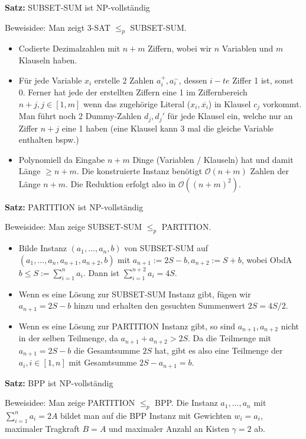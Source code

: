 \documentclass[a4paper,graphics,11pt]{article}
\begin{document}
\textbf{Satz:} SUBSET-SUM ist \textsf{NP}-vollständig

Beweisidee: Man zeigt 3-SAT $\leq_p$ SUBSET-SUM.
\begin{itemize}
    \item Codierte Dezimalzahlen mit $n+m$ Ziffern, wobei wir $n$ Variablen und $m$ Klauseln haben.
    \item Für jede Variable $x_i$ erstelle 2 Zahlen $a_i^+, a_i^-$, dessen $i-te$ Ziffer
        1 ist, sonst 0. Ferner hat jede der erstellten Ziffern eine 1 im Ziffernbereich $n+j, j \in [1,m]$
        wenn das zugehörige Literal ($x_i, \overline{x_i}$) in Klausel $c_j$ vorkommt. Man führt noch 2 Dummy-Zahlen $d_j,d_j'$
        für jede Klausel ein, welche nur an Ziffer $n+j$ eine 1 haben (eine Klausel kann 3 mal die gleiche Variable enthalten bspw.)
    \item Polynomiell da Eingabe $n+m$ Dinge (Variablen / Klauseln) hat und damit Länge $\geq n+m$.
        Die konstruierte Instanz benötigt $\mathcal{O}(n+m)$ Zahlen der Länge $n+m$. Die Reduktion erfolgt
        also in $\mathcal{O}((n+m)^2)$.
\end{itemize}

\strut

\textbf{Satz:} PARTITION ist \textsf{NP}-vollständig

Beweisidee: Man zeige SUBSET-SUM $\leq_p$ PARTITION.
\begin{itemize}
    \item Bilde Instanz $(a_1,...,a_n,b)$ von SUBSET-SUM auf $(a_1,...,a_n,a_{n+1},a_{n+2},b)$ mit
        $a_{n+1} := 2S - b, a_{n+2} := S + b$, wobei ObdA $b \leq S := \sum_{i=1}^{n} a_i$.
        Dann ist $\sum_{i=1}^{n+2} a_i = 4S$.
    \item Wenn es eine Lösung zur SUBSET-SUM Instanz gibt, fügen wir $a_{n+1} = 2S-b$ hinzu
        und erhalten den gesuchten Summenwert $2S = 4S/2$.
    \item Wenn es eine Lösung zur PARTITION Instanz gibt, so sind $a_{n+1},a_{n+2}$ nicht in der
        selben Teilmenge, da $a_{n+1}+a_{n+2} > 2S$. Da die Teilmenge mit $a_{n+1} = 2S-b$
        die Gesamtsumme $2S$ hat, gibt es also eine Teilmenge der $a_i, i\in [1,n]$ mit Gesamtsumme
        $2S - a_{n+1} = b$.
\end{itemize}

\strut

\textbf{Satz:} BPP ist \textsf{NP}-vollständig

Beweisidee: Man zeige PARTITION $\leq_p$ BPP. Die Instanz $a_1,...,a_n$ mit $\sum_{i=1}^{n} a_i = 2A$
bildet man auf die BPP Instanz mit Gewichten $w_i = a_i$, maximaler Tragkraft $B = A$ und maximaler
Anzahl an Kisten $\gamma = 2$ ab.
\end{document}

